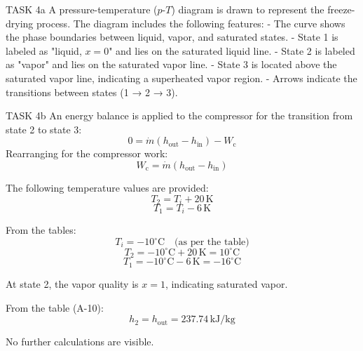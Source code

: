 TASK 4a  
A pressure-temperature (\(p\)-\(T\)) diagram is drawn to represent the freeze-drying process. The diagram includes the following features:  
- The curve shows the phase boundaries between liquid, vapor, and saturated states.  
- State 1 is labeled as "liquid, \(x = 0\)" and lies on the saturated liquid line.  
- State 2 is labeled as "vapor" and lies on the saturated vapor line.  
- State 3 is located above the saturated vapor line, indicating a superheated vapor region.  
- Arrows indicate the transitions between states (1 → 2 → 3).  

TASK 4b  
An energy balance is applied to the compressor for the transition from state 2 to state 3:  
\[
0 = \dot{m} \left( h_{\text{out}} - h_{\text{in}} \right) - W_{\text{c}}
\]  
Rearranging for the compressor work:  
\[
W_{\text{c}} = \dot{m} \left( h_{\text{out}} - h_{\text{in}} \right)
\]  

The following temperature values are provided:  
\[
T_2 = T_i + 20 \, \text{K}
\]  
\[
T_1 = T_i - 6 \, \text{K}
\]  

From the tables:  
\[
T_i = -10^\circ\text{C} \quad \text{(as per the table)}
\]  
\[
T_2 = -10^\circ\text{C} + 20 \, \text{K} = 10^\circ\text{C}
\]  
\[
T_1 = -10^\circ\text{C} - 6 \, \text{K} = -16^\circ\text{C}
\]  

At state 2, the vapor quality is \(x = 1\), indicating saturated vapor.  

From the table (A-10):  
\[
h_2 = h_{\text{out}} = 237.74 \, \text{kJ/kg}
\]  

No further calculations are visible.